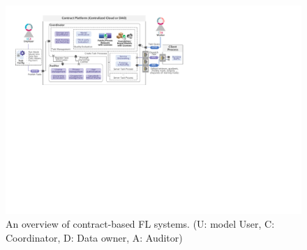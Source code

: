 \begin{figure}[t]
    \centering
    \includegraphics[width=\linewidth]{fig/contract_frame.pdf}
    \caption{An overview of contract-based FL systems. (U: model User, C: Coordinator, D: Data owner, A: Auditor)}
    \Description{}
    \label{fig:contract}
\end{figure}



